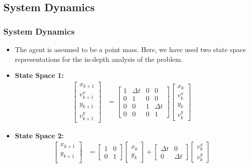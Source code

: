 \documentclass{beamer}
\begin{document}
\subsection{System Dynamics}

\begin{frame}
\frametitle{System Dynamics}
\begin{itemize}
    \item The agent is assumed to be a point mass. Here, we have used two state space representations for the in-depth analysis of the problem.
    \item \textbf{State Space 1:}
    \begin{align*}
        \begin{bmatrix}
            x_{k+1} \\
            v^x_{k+1} \\
            y_{k+1} \\
            v^y_{k+1}
        \end{bmatrix} &= \begin{bmatrix}
            1 & \Delta t & 0 & 0 \\
            0 & 1 & 0 & 0 \\
            0 & 0 & 1 & \Delta t \\
            0 & 0 & 0 & 1
        \end{bmatrix}
        \begin{bmatrix}
            x_k \\
            v^x_k \\
            y_k \\
            v^y_k
        \end{bmatrix}
    \end{align*}
    \item \textbf{State Space 2:}
    \begin{align*}
        \begin{bmatrix}
            x_{k+1} \\
            y_{k+1} \\
        \end{bmatrix} &= \begin{bmatrix}
            1 & 0 \\
            0 & 1
        \end{bmatrix} \begin{bmatrix}
            x_k \\
            y_k
        \end{bmatrix} + \begin{bmatrix}
            \Delta t & 0 \\
            0 & \Delta t
        \end{bmatrix} \begin{bmatrix}
            v^x_k \\
            v^y_k
        \end{bmatrix}
    \end{align*}
\end{itemize}
\end{frame}
\end{document}
